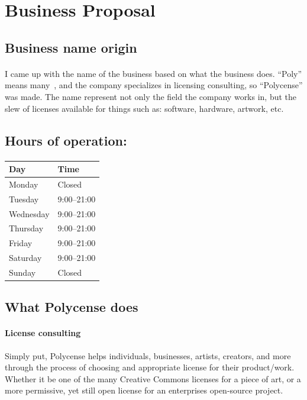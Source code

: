 \section{Business Proposal}
\subsection{Business name origin}
\paragraph{}
I came up with the name of the business based on what the business does.
``Poly'' means many~\cite{Dictionary.com2017}, and the company
specializes in licensing consulting, so ``Polycense'' was made. The name
represent not only the field the company works in, but the slew of licenses
available for things such as: software, hardware, artwork, etc.
\par

\subsection{Hours of operation:}
\paragraph{}
\begin{table}[h]
	\centering
	\begin{tabular}{l|l}
		Day       & Time       \\ \toprule
		Monday    & Closed     \\
		Tuesday   & 9:00--21:00 \\
		Wednesday & 9:00--21:00 \\
		Thursday  & 9:00--21:00 \\
		Friday    & 9:00--21:00 \\
		Saturday  & 9:00--21:00 \\
		Sunday    & Closed    
	\end{tabular}
\end{table}
\par

\subsection{What Polycense does}
\paragraph{License consulting} 
Simply put, Polycense helps individuals, businesses, artists, creators, and
more through the process of choosing and appropriate license for their 
product/work. Whether it be one of the many Creative Commons licenses
for a piece of art, or a more permissive, yet still open license for
an enterprises open-source project. 
\par

